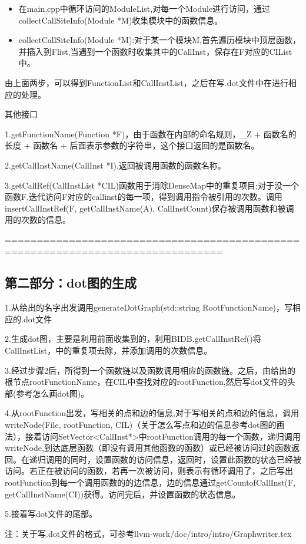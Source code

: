 \begin{itemize}
\item{在main.cpp中循环访问的ModuleList,对每一个Module进行访问，通过collectCallSiteInfo(Module *M)收集模块中的函数信息。}

\item{collectCallSiteInfo(Module *M):对于某一个模块M,首先遍历模块中顶层函数，并插入到Flist,当遇到一个函数时收集其中的CallInst，保存在F对应的CIList中。}

\end{itemize}
\par{由上面两步，可以得到FunctionList和CallInstList，之后在写.dot文件中在进行相应的处理。}

\par{其他接口}
\par{1.getFunctionName(Function *F)，由于函数在内部的命名规则，\_Z + 函数名的长度 + 函数名 + 后面表示参数的字符串，这个接口返回的是函数名。}
\par{2.getCallInstName(CallInst *I),返回被调用函数的函数名称。}

\par{3.getCallRef(CallInstList *CIL)函数用于消除DenseMap中的重复项目;对于没一个函数F,迭代访问F对应的callinst的每一项，得到调用指令被引用的次数。调用insertCallInstRef(F, getCallInstName(A), CallInstCount)保存被调用函数和被调用的次数的信息。}


================================================================================


\subsection{第二部分：dot图的生成}
\par{1.从给出的名字出发调用generateDotGraph(std::string RootFunctionName)，写相应的.dot文件}
\par{2.生成dot图，主要是利用前面收集到的，利用BIDB.getCallInstRef()将CallInstList，中的重复项去除，并添加调用的次数信息。}
\par{3.经过步骤2后，所得到一个函数链以及函数调用相应的函数链。之后，由给出的根节点rootFunctionName，在CIL中查找对应的rootFunction,然后写dot文件的头部(参考怎么画dot图)。}
\par{4.从rootFunction出发，写相关的点和边的信息,对于写相关的点和边的信息，调用writeNode(File, rootFunction, CIL)（关于怎么写点和边的信息参考dot图的画法），接着访问SetVector<CallInst*>中rootFunction调用的每一个函数，递归调用writeNode,到达底层函数（即没有调用其他函数的函数）或已经被访问过的函数返回。在递归调用的同时，设置函数的访问信息，返回时，设置此函数的状态已经被访问。若正在被访问的函数，若再一次被访问，则表示有循环调用了，之后写出rootFunction到每一个调用函数的的边信息，边的信息通过getCountofCallInst(F, getCallInstName(CI))获得。访问完后，并设置函数的状态信息。}
\par{5.接着写dot文件的尾部。}
\par{注：关于写.dot文件的格式，可参考llvm-work/doc/intro/intro/Graphwriter.tex }
